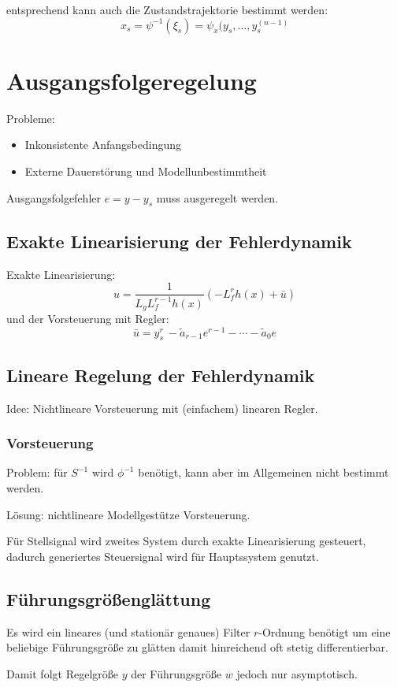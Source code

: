 entsprechend kann auch die Zustandstrajektorie bestimmt werden:
\begin{equation}
    x_s = \psi^{-1}(\xi_s) = \psi_x(y_s, \ldots, y_s^{(n-1)}
\end{equation}

\section{Ausgangsfolgeregelung}
Probleme:
\begin{itemize}
    \item Inkonsistente Anfangsbedingung
    \item Externe Dauerstörung und Modellunbestimmtheit
\end{itemize}
Ausgangsfolgefehler $e=y-y_s$ muss ausgeregelt werden.

\subsection{Exakte Linearisierung der Fehlerdynamik}
Exakte Linearisierung:
\begin{equation}
    u = \frac{1}{L_g L_f^{r-1} h(x)} (-L_f^r h(x) + \bar{u})
\end{equation}
und der Vorsteuerung mit Regler:
\begin{equation}
    \bar{u} = y_s^{r}\ - \tilde{a}_{r-1} e^{r-1} - \cdots - \tilde{a}_0 e
\end{equation}

\subsection{Lineare Regelung der Fehlerdynamik}
Idee: Nichtlineare Vorsteuerung mit (einfachem) linearen Regler.

\subsubsection{Vorsteuerung}
Problem: für $S^{-1}$ wird $\phi^{-1}$ benötigt, kann aber im Allgemeinen nicht bestimmt werden.

Lösung: nichtlineare Modellgestütze Vorsteuerung.

Für Stellsignal wird zweites System durch exakte Linearisierung gesteuert, dadurch generiertes Steuersignal wird
für Hauptssystem genutzt.

\subsection{Führungsgrößenglättung}
Es wird ein lineares (und stationär genaues) Filter $r$-Ordnung benötigt um eine 
beliebige Führungsgröße zu glätten damit hinreichend oft stetig differentierbar.

Damit folgt Regelgröße $y$ der Führungsgröße $w$ jedoch nur asymptotisch.

